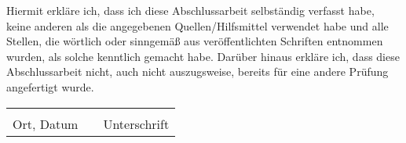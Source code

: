 Hiermit erkläre ich, dass ich diese Abschlussarbeit selbständig verfasst
habe, keine anderen als die angegebenen Quellen/Hilfsmittel verwendet
habe und alle Stellen, die wörtlich oder sinngemäß aus veröffentlichten
Schriften entnommen wurden, als solche kenntlich gemacht habe. Darüber
hinaus erkläre ich, dass diese Abschlussarbeit nicht, auch nicht auszugsweise,
bereits für eine andere Prüfung angefertigt wurde.\\
\begin{tabular}{lp{3em}l}
\vspace{1cm}
 \hspace{6cm}   && \hspace{6cm} \\\cline{1-1}\cline{3-3}
 Ort, Datum     && Unterschrift
\end{tabular}


\blankpage





%
%
